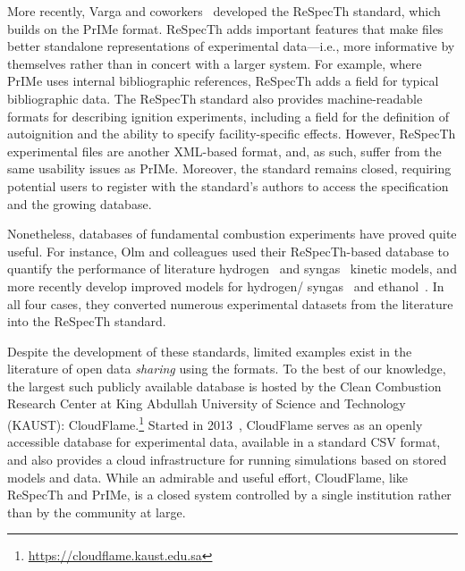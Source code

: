 \documentclass[12pt]{ijck}
\begin{document}
More recently, Varga and coworkers~\autocite{Varga2015a,Varga2015b} developed the
ReSpecTh standard, which builds on the PrIMe format. ReSpecTh adds important
features that make files better standalone representations of experimental
data---i.e., more informative by themselves rather than in concert with a larger
system. For example, where PrIMe uses internal bibliographic references,
ReSpecTh adds a field for typical bibliographic data. The ReSpecTh standard also
provides machine-readable formats for describing ignition experiments, including
a field for the definition of autoignition and the ability to specify
facility-specific effects. However, ReSpecTh experimental files are another
XML-based format, and, as such, suffer from the same usability issues as PrIMe.
Moreover, the standard remains closed, requiring potential users to register
with the standard's authors to access the specification and the growing database.

Nonetheless, databases of fundamental combustion experiments
have proved quite useful. For instance, Olm and colleagues used their
ReSpecTh-based database to quantify the performance of literature
hydrogen~\autocite{Olm:2014gn} and syngas~\autocite{Olm:2015ch} kinetic models,
and more recently develop improved models for hydrogen\slash
syngas~\autocite{Varga:2016gj} and ethanol~\autocite{Olm:2016et}. In all four
cases, they converted numerous experimental datasets from the literature into
the ReSpecTh standard.

Despite the development of these standards, limited examples exist in the
literature of open data \emph{sharing} using the formats. To the best
of our knowledge, the largest such publicly available database is hosted by
the Clean Combustion Research Center at King Abdullah University of Science and
Technology (KAUST): CloudFlame.\footnote{\url{https://cloudflame.kaust.edu.sa}}
Started in 2013~\autocite{Goteng:2013cf,Goteng:2014,ReynoChiasson:2015}, CloudFlame
serves as an openly accessible database for experimental data, available in a standard
CSV format, and also provides a cloud infrastructure for running simulations
based on stored models and data. While an admirable and useful effort,
CloudFlame, like ReSpecTh and PrIMe, is a closed system controlled by a single
institution rather than by the community at large.
\end{document}
